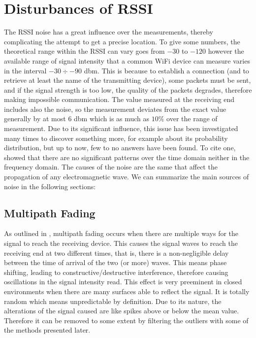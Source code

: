 \documentclass[12pt]{report}
\begin{document}
\chapter{Disturbances of RSSI}
The RSSI noise has a great influence over the measurements, thereby complicating the attempt to get a precise location. To give some numbers, the theoretical range within the RSSI can vary goes from $-30$ to $-120$ however the available range of signal intensity that a common WiFi device can measure varies in the interval $-30\div-90$ dbm. This is because to establish a connection (and to retrieve at least the name of the transmitting device), some packets must be sent, and if the signal strength is too low, the quality of the packets degrades, therefore making impossible communication. The value measured at the receiving end includes also the noise, so the measurement deviates from the exact value generally by at most $6$ dbm which is as much as $10\%$ over the range of measurement.
Due to its significant influence, this issue has been investigated many times to discover something more, for example about its probability distribution, but up to now, few to no answers have been found. To cite one, \cite{4608603} showed that there are no significant patterns over the time domain neither in the frequency domain. The causes of the noise are the same that affect the propagation of any electromagnetic wave. We can summarize the main sources of noise in the following sections: 
\section{Multipath Fading} 
As outlined in \cite{onl11}, multipath fading occurs when there are multiple ways for the signal to reach the receiving device. This causes the signal waves to reach the receiving end at two different times, that is, there is a non-negligible delay between the time of arrival of the two (or more) waves. This means phase shifting, leading to constructive/destructive interference, therefore causing oscillations in the signal intensity read. This effect is very preeminent in closed environments when there are many surfaces able to reflect the signal. It is totally random \cite{10.5555/559977} which means unpredictable by definition. Due to its nature, the alterations of the signal caused are like spikes above or below the mean value. Therefore it can be removed to some extent by filtering the outliers with some of the methods presented later.
\end{document}
